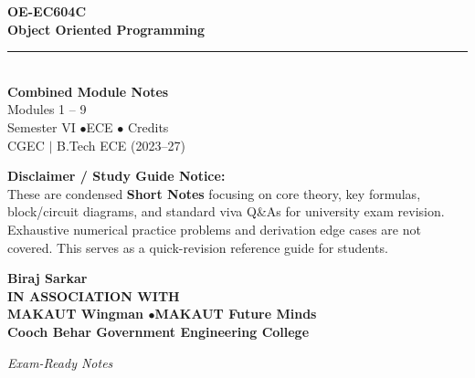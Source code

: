 \documentclass[12pt,a4paper]{article}
\begin{document}
\thispagestyle{empty}


\vspace*{1.0cm}
\begin{center}
  {\Huge\bfseries\color{myred} OE-EC604C}\\[10pt]
  {\LARGE\bfseries\color{mydark} Object Oriented Programming}\\[20pt]
  {\color{myred}\rule{0.7\linewidth}{1.5pt}}\\[18pt]
  {\Large\color{myteal}\textbf{Combined Module Notes}}\\[8pt]
  {\large\color{mydark} Modules 1 -- 9}\\[40pt]
  {\normalsize\color{mydark} Semester VI \quad$\bullet$\quad ECE \quad$\bullet$ Credits}\\[12pt]
  {\normalsize\color{mydark} CGEC \;$|$\; B.Tech ECE (2023--27)}
\end{center}
\vspace{1.0cm}
\begin{center}
  \begin{tcolorbox}[colback=mygray, colframe=mgframe, boxrule=0.5pt, arc=3pt, width=0.85\linewidth]
    \centering\small\color{mydark}
    \textbf{Disclaimer / Study Guide Notice:}\\
    These are condensed \textbf{Short Notes} focusing on core theory, key formulas, block/circuit diagrams, and standard viva Q\&As for university exam revision. Exhaustive numerical practice problems and derivation edge cases are not covered. This serves as a quick-revision reference guide for students.
  \end{tcolorbox}
\end{center}
\vfill
\vspace{0.6cm}
\begin{center}
  {\large\bfseries\color{mypurple} Biraj Sarkar}\\[16pt]
  {\footnotesize\color{watermark}\textbf{IN ASSOCIATION WITH}}\\[8pt]
  {\small\bfseries\color{mydark} MAKAUT Wingman \quad$\bullet$\quad MAKAUT Future Minds}\\[12pt]
  {\large\bfseries\color{myteal} Cooch Behar Government Engineering College}
\end{center}
\vfill
\begin{center}{\small\color{watermark}\textit{Exam-Ready Notes}}\end{center}
\clearpage
\end{document}
